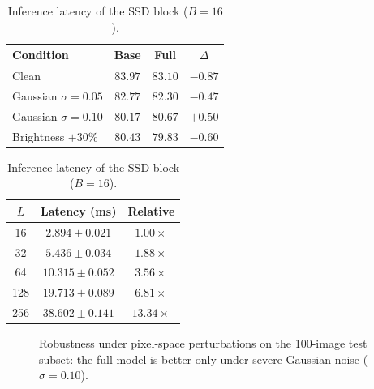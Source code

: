 \documentclass[pdflatex,sn-mathphys-num]{sn-jnl}
\begin{document}
\begin{table}[t]
\centering
\begin{minipage}[t]{0.49\textwidth}
\centering
\caption{Corruption stress test (Mean Recall, 100-image subset).}
\label{tab:robustness}
\scriptsize
\setlength{\tabcolsep}{3pt}
\begin{tabular}{@{}lccc@{}}
\toprule
\textbf{Condition} & \textbf{Base} & \textbf{Full} & \textbf{$\Delta$} \\
\midrule
Clean & $83.97$ & $83.10$ & $-0.87$ \\
Gaussian $\sigma=0.05$ & $82.77$ & $82.30$ & $-0.47$ \\
Gaussian $\sigma=0.10$ & $80.17$ & $\mathbf{80.67}$ & $\mathbf{+0.50}$ \\
Brightness $+30\%$ & $80.43$ & $79.83$ & $-0.60$ \\
\bottomrule
\end{tabular}
\end{minipage}\hfill
\begin{minipage}[t]{0.49\textwidth}
\centering
\caption{Inference latency of the SSD block ($B=16$).}
\label{tab:scaling}
\scriptsize
\setlength{\tabcolsep}{3pt}
\begin{tabular}{@{}ccc@{}}
\toprule
\textbf{$L$} & \textbf{Latency (ms)} & \textbf{Relative} \\
\midrule
16 & $2.894 \pm 0.021$ & $1.00\times$ \\
32 & $5.436 \pm 0.034$ & $1.88\times$ \\
64 & $10.315 \pm 0.052$ & $3.56\times$ \\
128 & $19.713 \pm 0.089$ & $6.81\times$ \\
256 & $38.602 \pm 0.141$ & $13.34\times$ \\
\bottomrule
\end{tabular}
\end{minipage}
\end{table}

\begin{figure}[!htbp]
\centering
{}
\caption{Robustness under pixel-space perturbations on the 100-image test subset: the full model is better only under severe Gaussian noise ($\sigma=0.10$).}
\label{fig:robustness}
\end{figure}
\end{document}
